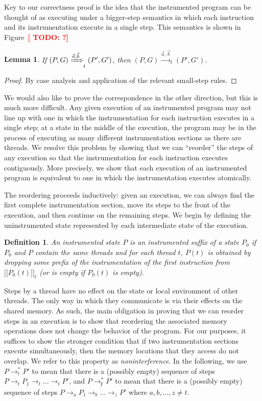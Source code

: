 \documentclass[preprint, 10pt]{sigplanconf}
\newcommand{\TODO}[1]{\textbf{\textcolor{red}{[ TODO: #1]}}}
\newcommand{\meanl}{\ensuremath{[ \! [}}
\newcommand{\meanr}{\ensuremath{] \! ]}}
\newcommand{\means}[1]{\ensuremath{\meanl #1 \meanr}}
\newcommand{\instr}[2]{\ensuremath{\means{#2}_{#1}}}
\newtheorem{lemma}{Lemma}
\newtheorem{definition}{Definition}
\begin{document}
Key to our correctness proof is the idea that the instrumented program can be thought of as executing under a bigger-step semantics in which each instruction and its instrumentation execute in a single step. This semantics is shown in Figure~\TODO{?}
\begin{lemma}\label{iexec-exec}If $(P, G) \xRightarrow{\vec{a}, \vec{b}}_t (P', G')$, then $(P, G) \xrightarrow{\vec{a}, \vec{b}}_t (P', G')$.\end{lemma}
\begin{proof}By case analysis and application of the relevant small-step rules.\end{proof}

We would also like to prove the correspondence in the other direction, but this is much more difficult. Any given execution of an instrumented program may not line up with one in which the instrumentation for each instruction executes in a single step; at a state in the middle of the execution, the program may be in the process of executing as many different instrumentation sections as there are threads. We resolve this problem by showing that we can ``reorder'' the steps of any execution so that the instrumentation for each instruction executes contiguously. More precisely, we show that each execution of an instrumented program is equivalent to one in which the instrumentation executes atomically.

The reordering proceeds inductively: given an execution, we can always find the first complete instrumentation section, move its steps to the front of the execution, and then continue on the remaining steps. We begin by defining the uninstrumented state represented by each intermediate state of the execution.
\begin{definition}An instrumented state $P$ is an \emph{instrumented suffix} of a state $P_0$ if $P_0$ and $P$ contain the same threads and for each thread $t$, $P(t)$ is obtained by dropping some prefix of the instrumentation of the first instruction from $\instr{t}{P_0(t)}$ (or is empty if $P_0(t)$ is empty).\end{definition}

Steps by a thread have no effect on the state or local environment of other threads. The only way in which they communicate is via their effects on the shared memory. As such, the main obligation in proving that we can reorder steps in an execution is to show that reordering the associated memory operations does not change the behavior of the program. For our purposes, it suffices to show the stronger condition that if two instrumentation sections execute simultaneously, then the memory locations that they access do not overlap. We refer to this property as \emph{noninterference}. In the following, we use $P \rightarrow^{*}_t P'$ to mean that there is a (possibly empty) sequence of steps $P \rightarrow_t P_1 \rightarrow_t ... \rightarrow_t P'$, and $P \rightarrow^{*}_{\not t} P'$ to mean that there is a (possibly empty) sequence of steps $P \rightarrow_a P_1 \rightarrow_b ... \rightarrow_z P'$ where $a, b, ..., z \neq t$.
\end{document}
